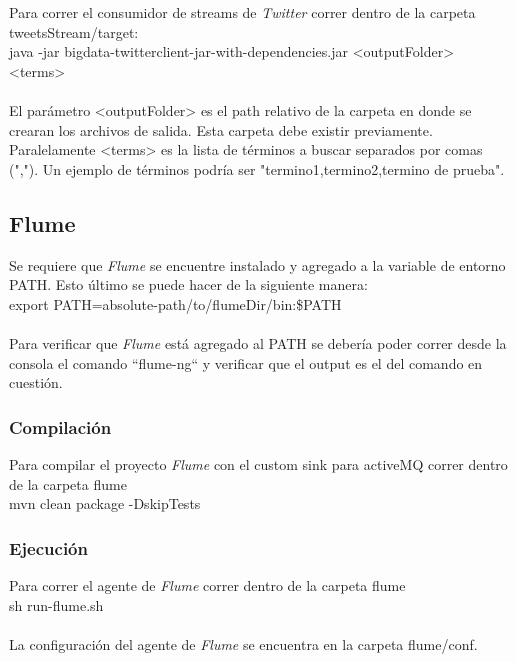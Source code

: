 \documentclass[a4paper,10pt]{article}
\begin{document}
Para correr el consumidor de streams de \textit{Twitter} correr dentro de la carpeta tweetsStream/target:
\\

	java -jar bigdata-twitterclient-jar-with-dependencies.jar <outputFolder> <terms>
\\
\\
El parámetro <outputFolder> es el path relativo de la carpeta en donde se crearan los archivos de salida. Esta carpeta debe existir previamente.
Paralelamente <terms> es la lista de términos a buscar separados por comas (","). Un ejemplo de términos podría ser "termino1,termino2,termino de prueba".

\subsection{Flume}

Se requiere que \textit{Flume} se encuentre instalado y agregado a la variable de entorno PATH.
Esto último se puede hacer de la siguiente manera:
\\

export PATH=absolute-path/to/flumeDir/bin:\$PATH
\\
\\
Para verificar que \textit{Flume} está agregado al PATH se debería poder correr desde la consola el comando ``flume-ng`` y
verificar que el output es el del comando en cuestión.

\subsubsection{Compilación}

Para compilar el proyecto \textit{Flume} con el custom sink para activeMQ correr dentro de la carpeta flume
\\

	mvn clean package -DskipTests

\subsubsection{Ejecución}

Para correr el agente de \textit{Flume} correr dentro de la carpeta flume
\\

	sh run-flume.sh
\\
\\
La configuración del agente de \textit{Flume} se encuentra en la carpeta flume/conf.
\end{document}
